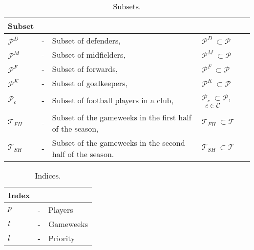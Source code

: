 \begin{table}[H]
\centering
\caption{Subsets.}
\begin{tabular}{@{}llll@{}}
\toprule
Subset            &   &                                       &                                                 \\ 
\midrule
$\mathcal{P}^{D}$ & - & Subset of defenders,                  & \quad  $\mathcal{P}^{D} \ \subset \mathcal{P}$  \\
$\mathcal{P}^{M}$ & - & Subset of midfielders,                & \quad $\mathcal{P}^{M} \ \subset \mathcal{P}$   \\
$\mathcal{P}^{F}$ & - & Subset of forwards,                   & \quad $\mathcal{P}^{F} \ \subset \mathcal{P}$   \\
$\mathcal{P}^{K}$ & - & Subset of goalkeepers,                & \quad $\mathcal{P}^{K} \ \subset \mathcal{P}$   \\
$\mathcal{P}_{c}$ & - & Subset of football players in a club, & \quad $\mathcal{P}_{c} \ \subset \mathcal{P}$, $\enskip c \in \mathcal{C}$  \\ 
$\mathcal{T}_{FH}$ & - & Subset of the gameweeks in the first half of the season,                & \quad $\mathcal{T}_{FH} \ \subset \mathcal{T}$   \\
$\mathcal{T}_{SH}$ & - & Subset of the gameweeks in the second half of the season.                & \quad $\mathcal{T}_{SH} \ \subset \mathcal{T}$   \\
\bottomrule
\end{tabular}
\end{table}


\begin{table}[H]
\centering
\caption{Indices.}
\begin{tabular}{@{}lll@{}}
\toprule
Index &   &           \\ \midrule
$p$   & - & Players   \\
$t$   & - & Gameweeks \\
$l$   & - & Priority  \\ \bottomrule
\end{tabular}
\end{table}


